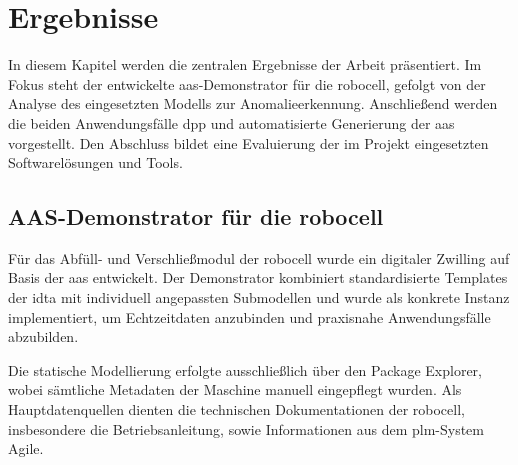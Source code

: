\newpage
\section{Ergebnisse}
In diesem Kapitel werden die zentralen Ergebnisse der Arbeit präsentiert. 
Im Fokus steht der entwickelte \acs{aas}-Demonstrator für die robocell, gefolgt von der Analyse des eingesetzten Modells zur Anomalieerkennung.
Anschließend werden die beiden Anwendungsfälle \acs{dpp} und automatisierte Generierung der \acs{aas} vorgestellt. 
Den Abschluss bildet eine Evaluierung der im Projekt eingesetzten Softwarelösungen und Tools.

\subsection{AAS-Demonstrator für die robocell}

Für das Abfüll- und Verschließmodul der robocell wurde ein digitaler Zwilling auf Basis der \acs{aas} entwickelt.
Der Demonstrator kombiniert standardisierte Templates der \acs{idta} mit individuell angepassten Submodellen und wurde als konkrete Instanz implementiert, um Echtzeitdaten anzubinden und praxisnahe Anwendungsfälle abzubilden.

Die statische Modellierung erfolgte ausschließlich über den Package Explorer, wobei sämtliche Metadaten der Maschine manuell eingepflegt wurden.
Als Hauptdatenquellen dienten die technischen Dokumentationen der robocell, insbesondere die Betriebsanleitung, sowie Informationen aus dem \acs{plm}-System Agile.




